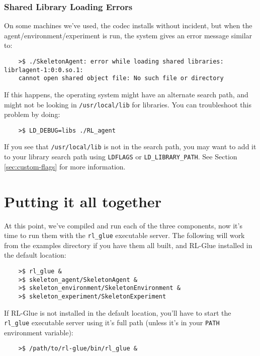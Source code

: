 \documentclass[11pt]{article}
\begin{document}
\subsubsection{Shared Library Loading Errors}
\label{sec:gotchas-shared-libs}
On some machines we've used, the codec installs without incident, but when the agent/environment/experiment is run, the system gives an error message similar to:
\begin{verbatim}
	>$ ./SkeletonAgent: error while loading shared libraries: librlagent-1:0:0.so.1:
	cannot open shared object file: No such file or directory
\end{verbatim}

If this happens, the operating system might have an alternate search path, and might not be looking in \texttt{/usr/local/lib} for libraries. 
You can troubleshoot this problem by doing:
\begin{verbatim}
	>$ LD_DEBUG=libs ./RL_agent
\end{verbatim}
If you see that \texttt{/usr/local/lib} is not in the search path, you may want to add it to your library search path using \texttt{LDFLAGS} or \texttt{LD\_LIBRARY\_PATH}.  See Section \ref{sec:custom-flags} for more information.  

\section{Putting it all together}
At this point, we've compiled and run each of the three components, now it's time to run them with the \texttt{rl\_glue} executable server.  The following will work from the examples directory if you have them all built, and RL-Glue installed in the default location:
\begin{verbatim}
	>$ rl_glue &
	>$ skeleton_agent/SkeletonAgent &
	>$ skeleton_environment/SkeletonEnvironment &
	>$ skeleton_experiment/SkeletonExperiment	
\end{verbatim}

If RL-Glue is not installed in the default location, you'll have to start the \texttt{rl\_glue} executable server using it's full path (unless it's in your \texttt{PATH} environment variable):
\begin{verbatim}
	>$ /path/to/rl-glue/bin/rl_glue &
\end{verbatim}
\end{document}
